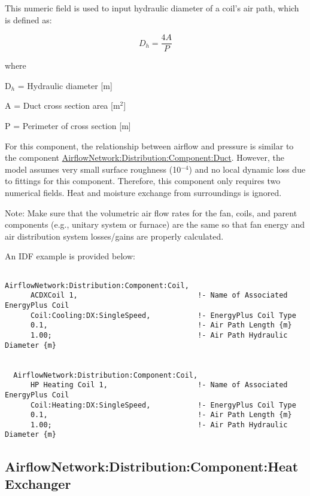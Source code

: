 This numeric field is used to input hydraulic diameter of a coil's air path, which is defined as:

\begin{equation}
{D_h} = \frac{{4A}}{P}
\end{equation}

where

D\(_{h}\) = Hydraulic diameter {[}m{]}

A = Duct cross section area {[}m\(^{2}\){]}

P = Perimeter of cross section {[}m{]}

For this component, the relationship between airflow and pressure is similar to the component \hyperref[airflownetworkdistributioncomponentduct]{AirflowNetwork:Distribution:Component:Duct}. However, the model assumes very small surface roughness (10\(^{-4}\)) and no local dynamic loss due to fittings for this component. Therefore, this component only requires two numerical fields. Heat and moisture exchange from surroundings is ignored.

Note: Make sure that the volumetric air flow rates for the fan, coils, and parent components (e.g., unitary system or furnace) are the same so that fan energy and air distribution system losses/gains are properly calculated.

An IDF example is provided below:

\begin{lstlisting}

AirflowNetwork:Distribution:Component:Coil,
      ACDXCoil 1,                            !- Name of Associated EnergyPlus Coil
      Coil:Cooling:DX:SingleSpeed,           !- EnergyPlus Coil Type
      0.1,                                   !- Air Path Length {m}
      1.00;                                  !- Air Path Hydraulic Diameter {m}


  AirflowNetwork:Distribution:Component:Coil,
      HP Heating Coil 1,                     !- Name of Associated EnergyPlus Coil
      Coil:Heating:DX:SingleSpeed,           !- EnergyPlus Coil Type
      0.1,                                   !- Air Path Length {m}
      1.00;                                  !- Air Path Hydraulic Diameter {m}
\end{lstlisting}

\subsection{AirflowNetwork:Distribution:Component:HeatExchanger}\label{airflownetworkdistributioncomponentheatexchanger}

